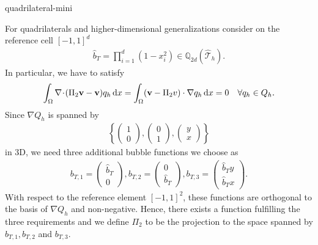 \begin{Problem}{quadrilateral-mini}
\begin{solution}
  For quadrilaterals and higher-dimensional generalizations consider
  on the reference cell $[-1,1]^d$
  \begin{align}
    \hat{b}_T=\prod_{i=1}^d(1-x_i^2)\in \mathbb{Q}_{2d}(\hat{\mathcal{T}}_h).
  \end{align}
  In particular, we have to satisfy
  \begin{gather}
    \int_\Omega \nabla\!\cdot\!(\Pi_2 \mathbf v-\mathbf v) q_h \,\mathrm{d} x
    = \int_\Omega (\mathbf v-\Pi_2v)\cdot\nabla q_h\,\mathrm{d} x
    = 0 \quad \forall q_h\in Q_h.
  \end{gather}
  Since $\nabla Q_h$ is spanned by
  \begin{align}
    \left\{
      \begin{pmatrix} 1 \\0 \end{pmatrix},
      \begin{pmatrix} 0 \\1 \end{pmatrix},
      \begin{pmatrix} y \\x \end{pmatrix}
    \right\}
  \end{align}
  in 3D, we need three additional bubble functions we choose as
  \begin{align}
    b_{T,1}= \begin{pmatrix} \hat{b}_T   \\ 0         \end{pmatrix},
    b_{T,2}= \begin{pmatrix}         0   \\ \hat{b}_T \end{pmatrix},
    b_{T,3}= \begin{pmatrix} \hat{b}_T y \\ \hat{b}_T x \end{pmatrix}.
  \end{align}
  With respect to the reference element $[-1,1]^2$, these functions are orthogonal
  to the basis of $\nabla Q_h$ and non-negative. Hence, there exists a function
  fulfilling the three requirements and we define $\Pi_2$ to be the projection to the
  space spanned by $b_{T,1}, b_{T,2}$ and $b_{T,3}$.
\end{solution}
\end{Problem}

